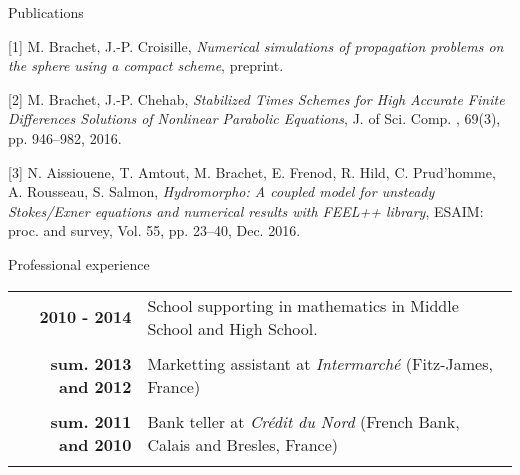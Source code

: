 \documentclass[10pt,a4paper]{report}
\begin{document}
\vspace{.4cm}
\noindent
{\selectfont
\begin{Large}
Publications
\end{Large}
\hrulefill
}
\vspace{0.5cm}

[1] {\sc  M. Brachet, J.-P. Croisille}, {\sl Numerical simulations of propagation problems on the sphere using a compact scheme}, preprint.

\vspace{0.6cm}

[2] {\sc M. Brachet, J.-P. Chehab}, {\sl Stabilized Times Schemes for High Accurate Finite Differences Solutions of Nonlinear Parabolic Equations}, J. of Sci. Comp. , 69(3), pp. 946--982, 2016.

\vspace{0.6cm}

[3] {\sc  N. Aissiouene, T. Amtout, M. Brachet, E. Frenod, R. Hild, C. Prud'homme, A. Rousseau, S. Salmon}, {\sl  Hydromorpho: A coupled model for unsteady Stokes/Exner equations and numerical results with FEEL++ library}, ESAIM: proc. and survey, Vol. 55, pp. 23--40, Dec. 2016.






\vspace{.5cm}
\noindent
{\selectfont
\begin{Large}
Professional experience
\end{Large}
\hrulefill
}

\noindent
\begin{center}
\begin{tabular}{r l}
\textbf{2010 - 2014} & School supporting in mathematics in Middle School and High School.\\

& \\

\textbf{sum. 2013 and 2012} & Marketting assistant at \textit{Intermarché} (Fitz-James, France) \\

& \\

\textbf{sum. 2011 and 2010} & Bank teller at \textit{Crédit du Nord} (French Bank, Calais and Bresles, France) \\

& \\

\end{tabular}
\end{center}
\end{document}
